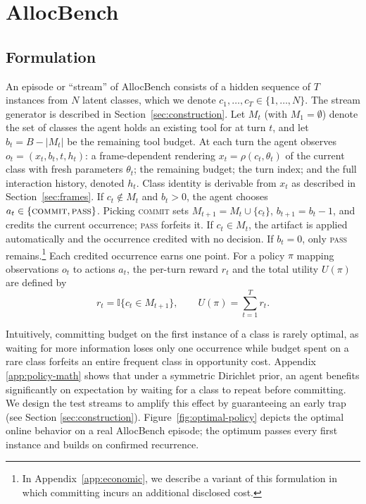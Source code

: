 \documentclass{article}
\begin{document}
\section{AllocBench}
\label{sec:allocbench}

\subsection{Formulation}
\label{sec:decision-process}

An episode or ``stream'' of AllocBench consists of a hidden sequence of $T$ instances from $N$ latent classes, which we denote $c_1,\ldots,c_T\in \{1,\ldots,N\}.$ The stream generator is described in Section~\ref{sec:construction}. Let $M_t$ (with $M_1=\emptyset$) denote the set of classes the agent holds an existing tool for at turn $t$, and let $b_t=B-|M_t|$ be the remaining tool budget. At each turn the agent observes $o_t = (x_t, b_t, t, h_t)$: a frame-dependent rendering $x_t = \rho(c_t, \theta_t)$ of the current class with fresh parameters $\theta_t$; the remaining budget; the turn index; and the full interaction history, denoted $h_t$. Class identity is derivable from $x_t$ as described in Section~\ref{sec:frames}. If $c_t \notin M_t$ and $b_t > 0$, the agent chooses $a_t \in \{\textsc{commit}, \textsc{pass}\}$. Picking \textsc{commit} sets $M_{t+1} = M_t \cup \{c_t\}$, $b_{t+1} = b_t - 1$, and credits the current occurrence; \textsc{pass} forfeits it. If $c_t \in M_t$, the artifact is applied automatically and the occurrence credited with no decision. If $b_t = 0$, only \textsc{pass} remains.\footnote{In Appendix~\ref{app:economic}, we describe a variant of this formulation in which committing incurs an additional disclosed cost.} Each credited occurrence earns one point. For a policy $\pi$ mapping observations $o_t$ to actions $a_t$, the per-turn reward $r_t$ and the total utility $U(\pi)$ are defined by 
\begin{equation}
r_t = \mathbb{I}\{c_t \in M_{t+1}\},
\qquad
U(\pi) = \sum_{t=1}^{T} r_t.
\label{eq:utility}
\end{equation}

Intuitively, committing budget on the first instance of a class is rarely optimal, as waiting for more information loses only one occurrence while budget spent on a rare class forfeits an entire frequent class in opportunity cost. Appendix \ref{app:policy-math} shows that under a symmetric Dirichlet prior, an agent benefits significantly on expectation by waiting for a class to repeat before committing.  We design the test streams to amplify this effect by guaranteeing an early trap (see Section \ref{sec:construction}). Figure~\ref{fig:optimal-policy} depicts the optimal online behavior on a real AllocBench episode; the optimum passes every first instance and builds on confirmed recurrence.
\end{document}
